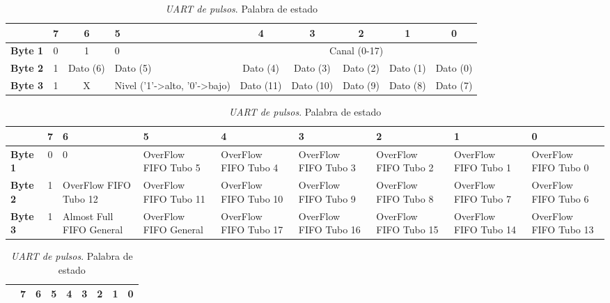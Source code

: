 		\begin{table}[h]
			\tiny
			\begin{tabularx}{\textwidth}{|l|c|c|X|c|c|c|c|c|}
				\hline
				\rowcolor[HTML]{C0C0C0} 
				\multicolumn{1}{|r|}{\textbf{Bit}}    	& 7 & 6          & 5 				& 4 	       & 3 	     & 2 	  & 1          & 0 	     \\ \hline
				\cellcolor[HTML]{C0C0C0}\textbf{Byte 1} & 0 & 1          & 0  				& \multicolumn{5}{c|}{Canal (0-17)}				     \\ \hline
				\cellcolor[HTML]{C0C0C0}\textbf{Byte 2} & 1 & Dato (6)	 & Dato (5)      		& Dato (4)     & Dato (3)    & Dato (2)   & Dato (1)   & Dato (0)    \\ \hline
				\cellcolor[HTML]{C0C0C0}\textbf{Byte 3} & 1 & X          & Nivel ('1'->alto, '0'->bajo) & Dato (11)    & Dato (10)   & Dato (9)   & Dato (8)   & Dato (7)    \\ \hline
			\end{tabularx}
			\caption{\emph{UART de pulsos}. Palabra de ancho de pulso}
			\label{tab:FPGAUartPulso}
			\begin{tabularx}{\textwidth}{|l|c|X|X|X|X|X|X|X|}
				\hline
				\rowcolor[HTML]{C0C0C0} 
				\multicolumn{1}{|r|}{\textbf{Bit}} 	& 7 & 6 		       & 5 		       & 4		       & 3 		       & 2		       & 1          	       & 0			\\ \hline
				\cellcolor[HTML]{C0C0C0}\textbf{Byte 1} & 0 & 0                        & OverFlow FIFO Tubo 5  & OverFlow FIFO Tubo 4  & OverFlow FIFO Tubo 3  & OverFlow FIFO Tubo 2  & OverFlow FIFO Tubo 1  & OverFlow FIFO Tubo 0	\\ \hline
				\cellcolor[HTML]{C0C0C0}\textbf{Byte 2} & 1 & OverFlow FIFO Tubo 12    & OverFlow FIFO Tubo 11 & OverFlow FIFO Tubo 10 & OverFlow FIFO Tubo 9  & OverFlow FIFO Tubo 8  & OverFlow FIFO Tubo 7  & OverFlow FIFO Tubo 6	\\ \hline
				\cellcolor[HTML]{C0C0C0}\textbf{Byte 3} & 1 & Almost Full FIFO General & OverFlow FIFO General & OverFlow FIFO Tubo 17 & OverFlow FIFO Tubo 16 & OverFlow FIFO Tubo 15 & OverFlow FIFO Tubo 14 & OverFlow FIFO Tubo 13	\\ \hline
			\end{tabularx}
			\caption{\emph{UART de pulsos}. Palabra de estado}
			\label{tab:FPGAUartOver}
			\begin{tabularx}{\textwidth}{|l|X|c|c|c|c|c|c|c|}
				\hline
				\rowcolor[HTML]{C0C0C0} 
				\multicolumn{1}{|r|}{\textbf{Bit}}    	 & 7 & 6           & 5 		& 4 	      & 3 	    & 2 	 & 1           & 0 	     	\\ \hline

\end{tabularx}
\end{table}
